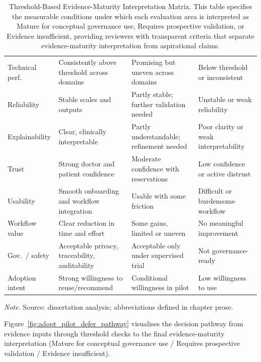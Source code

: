 {\tablestripes\tablefontsize
{}
\begin{xltabular}{\textwidth}{@{} >{\raggedright\arraybackslash}p{1.6cm} L L L @{}}
\caption[Threshold-Based Evidence-Maturity Interpretation Matrix]{Threshold-Based Evidence-Maturity Interpretation Matrix. This table specifies the measurable conditions under which each evaluation area is interpreted as Mature for conceptual governance use, Requires prospective validation, or Evidence insufficient, providing reviewers with transparent criteria that separate evidence-maturity interpretation from aspirational claims.}\label{tab:adopt_pilot_defer_matrix} \\
\toprule
{} &  &  &  \\
\midrule
\endfirsthead
\endhead
\bottomrule
\endlastfoot
Technical perf. & Consistently above threshold across domains & Promising but uneven across domains & Below threshold or inconsistent \\
\addlinespace
Reliability & Stable scales and outputs & Partly stable; further validation needed & Unstable or weak reliability \\
\addlinespace
Explainability & Clear, clinically interpretable & Partly understandable; refinement needed & Poor clarity or weak interpretability \\
\addlinespace
Trust & Strong doctor and patient confidence & Moderate confidence with reservations & Low confidence or active distrust \\
\addlinespace
Usability & Smooth onboarding and workflow integration & Usable with some friction & Difficult or burdensome workflow \\
\addlinespace
Workflow value & Clear reduction in time and effort & Some gains, limited or uneven & No meaningful improvement \\
\addlinespace
Gov.\ / safety & Acceptable privacy, traceability, auditability & Acceptable only under supervised trial & Not governance-ready \\
\addlinespace
Adoption intent & Strong willingness to reuse/recommend & Conditional willingness in pilot & Low willingness to use \\
\end{xltabular}}
\vspace{0.3em}\noindent\textit{Note.} Source: dissertation analysis; abbreviations defined in chapter prose.

\noindent Figure~\ref{fig:adopt_pilot_defer_pathway} visualises the decision pathway from evidence inputs through threshold checks to the final evidence-maturity interpretation (Mature for conceptual governance use / Requires prospective validation / Evidence insufficient).



